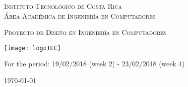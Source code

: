
\thispagestyle{empty} 

\begin{center}

\textsc{\LARGE Instituto Tecnol\'ogico de Costa Rica} \\
\textsc{\Large \'Area Acad\'emica de Ingenier\'ia en Computadores}

\textsc{\Large Proyecto de Dise\~no en Ingenier\'ia en Computadores}


\par\vspace{20mm}

\texttt{[image: logoTEC]}

\par\vspace*{\fill}

{\LARGE\bf{\textsf{ \Huge \scriptTitle}}}

\par\vspace*{\fill}

For the period: 19/02/2018 (week 2) - 23/02/2018 (week 4) 

\par\vspace{20mm}

\textsc{\Large \scriptAuthor}

\vspace*{\fill}

{\today}

\end{center}
\newpage 
\cleardoublepage  
